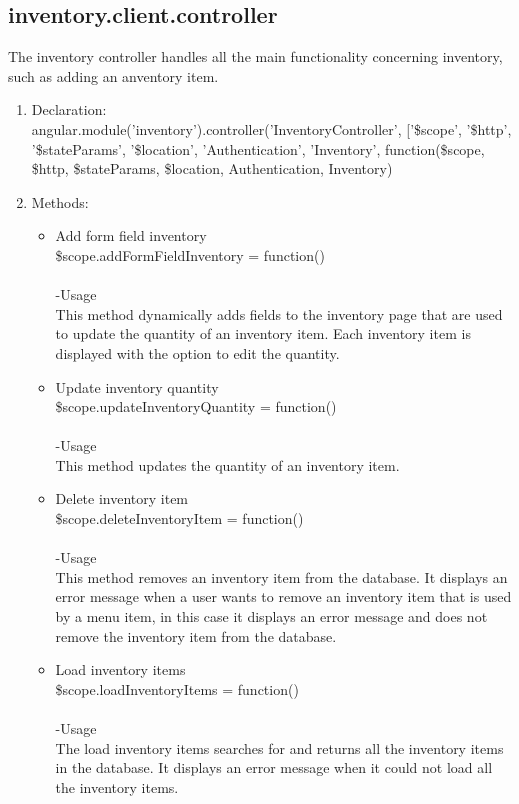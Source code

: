 \documentclass[a4paper,12pt]{report}
\begin{document}
\subsection{inventory.client.controller}
 The inventory controller handles all the main functionality concerning inventory, such as adding an anventory item.
\begin{enumerate}
\item Declaration:\\angular.module('inventory').controller('InventoryController', ['\$scope', '\$http', '\$stateParams', '\$location', 'Authentication', 'Inventory',
	function(\$scope, \$http, \$stateParams, \$location, Authentication, Inventory)
\item Methods:
	\begin{itemize}
	\item Add form field inventory\\
  \$scope.addFormFieldInventory = function()\\ \\
  -Usage\\ 
  This method dynamically adds fields to the inventory page that are used to update the quantity of an inventory item. Each inventory item is displayed with the option to edit the quantity.
\item  Update inventory quantity\\
 \$scope.updateInventoryQuantity = function()\\ \\
 -Usage\\
 This method updates the quantity of an inventory item.
 \item Delete inventory item\\
  \$scope.deleteInventoryItem = function()\\ \\
  -Usage\\ 
  This method removes an inventory item from the database. It displays an error message when a user wants to remove an inventory item that is used by a menu item, in this case it displays an error message and does not remove the inventory item from the database.
  \item Load inventory items\\
   \$scope.loadInventoryItems = function()\\ \\
   -Usage\\
   The load inventory items searches for and returns all the inventory items in the database. It displays an error message when it could not load all the inventory items.

\end{itemize}
\end{enumerate}
\end{document}
